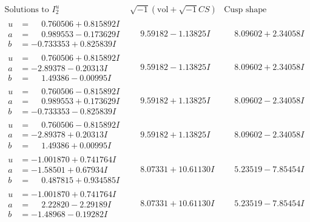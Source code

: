 \documentclass[1p]{elsarticle_modified}
\theoremstyle{definition}
\newcommand{\I}{\sqrt{-1}}
\begin{document}
$$\begin{array}{c|c|c}  
\text{Solutions to }I^u_{2}& \I (\text{vol} + \sqrt{-1}CS) & \text{Cusp shape}\\
 \hline 
\begin{aligned}
u &= \phantom{-}0.760506 + 0.815892 I \\
a &= \phantom{-}0.989553 - 0.173629 I \\
b &= -0.733353 + 0.825839 I\end{aligned}
 & \phantom{-}9.59182 - 1.13825 I & \phantom{-}8.09602 + 2.34058 I \\ \hline\begin{aligned}
u &= \phantom{-}0.760506 + 0.815892 I \\
a &= -2.89378 - 0.20313 I \\
b &= \phantom{-}1.49386 - 0.00995 I\end{aligned}
 & \phantom{-}9.59182 - 1.13825 I & \phantom{-}8.09602 + 2.34058 I \\ \hline\begin{aligned}
u &= \phantom{-}0.760506 - 0.815892 I \\
a &= \phantom{-}0.989553 + 0.173629 I \\
b &= -0.733353 - 0.825839 I\end{aligned}
 & \phantom{-}9.59182 + 1.13825 I & \phantom{-}8.09602 - 2.34058 I \\ \hline\begin{aligned}
u &= \phantom{-}0.760506 - 0.815892 I \\
a &= -2.89378 + 0.20313 I \\
b &= \phantom{-}1.49386 + 0.00995 I\end{aligned}
 & \phantom{-}9.59182 + 1.13825 I & \phantom{-}8.09602 - 2.34058 I \\ \hline\begin{aligned}
u &= -1.001870 + 0.741764 I \\
a &= -1.58501 + 0.67934 I \\
b &= \phantom{-}0.487815 + 0.934585 I\end{aligned}
 & \phantom{-}8.07331 + 10.61130 I & \phantom{-}5.23519 - 7.85454 I \\ \hline\begin{aligned}
u &= -1.001870 + 0.741764 I \\
a &= \phantom{-}2.22820 - 2.29189 I \\
b &= -1.48968 - 0.19282 I\end{aligned}
 & \phantom{-}8.07331 + 10.61130 I & \phantom{-}5.23519 - 7.85454 I \\ \hline\begin{aligned}

\end{aligned}
\end{array}$$
\end{document}
